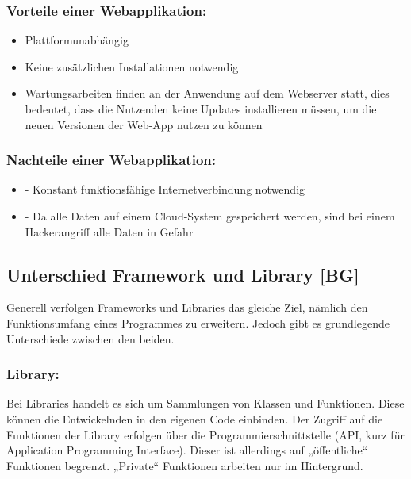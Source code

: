 \subsubsection{Vorteile einer Webapplikation:}

\begin{itemize}
  \item Plattformunabhängig
  \item Keine zusätzlichen Installationen notwendig
  \item Wartungsarbeiten finden an der Anwendung auf dem Webserver statt, dies bedeutet, dass die Nutzenden keine Updates installieren müssen, um die neuen Versionen der Web-App nutzen zu können
\end{itemize}

\subsubsection{Nachteile einer Webapplikation:}

\begin{itemize}
  \item -	Konstant funktionsfähige Internetverbindung notwendig
  \item -	Da alle Daten auf einem Cloud-System gespeichert werden, sind bei einem Hackerangriff alle Daten in Gefahr
\end{itemize}
\cite{WebApplikation} \cite{WebClientServer} \cite{dvsw}

\subsection{Unterschied Framework und Library [BG]}

Generell verfolgen Frameworks und Libraries das gleiche Ziel, nämlich den Funktionsumfang eines Programmes zu erweitern. Jedoch gibt es grundlegende Unterschiede zwischen den beiden.

\subsubsection{Library:}

Bei Libraries handelt es sich um Sammlungen von Klassen und Funktionen. Diese können die Entwickelnden in den eigenen Code einbinden. Der Zugriff auf die Funktionen der Library erfolgen über die Programmierschnittstelle (API, kurz für Application Programming Interface). Dieser ist allerdings auf „öffentliche“ Funktionen begrenzt. „Private“ Funktionen arbeiten nur im Hintergrund.

